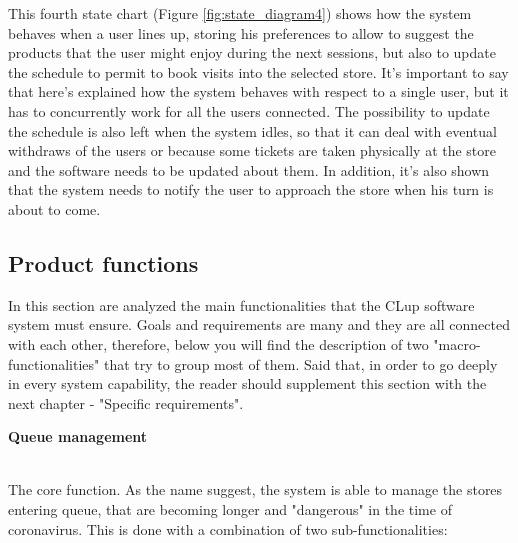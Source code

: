 \documentclass[]{article}
\begin{document}
		
		This fourth state chart (Figure \ref{fig:state_diagram4}) shows how the system behaves when a user lines up, storing his preferences to allow to suggest the products that the user might enjoy during the next sessions, but also to update the schedule to permit to book visits into the selected store. It’s important to say that here’s explained how the system behaves with respect to a single user, but it has to concurrently work for all the users connected. 
The possibility to update the schedule is also left when the system idles, so that it can deal with eventual withdraws of the users or because some tickets are taken physically at the store and the software needs to be updated about them. In addition, it’s also shown that the system needs to notify the user to approach the store when his turn is about to come.\\




\newpage

\subsection{Product functions}

In this section are analyzed the main functionalities that the CLup software system must ensure. Goals and requirements are many and they are all connected with each other, therefore, below you will find the description of two "macro-functionalities" that try to group most of them. Said that, in order to go deeply in every system capability, the reader should supplement this section with the next chapter - "Specific requirements".
\bigskip
\\
\begin{large}
	\textbf{Queue management}
\end{large}
\smallskip
\\
The core function. As the name suggest, the system is able to manage the stores entering queue, that are becoming longer and "dangerous" in the time of coronavirus. This is done with a combination of two sub-functionalities: 
\end{document}
